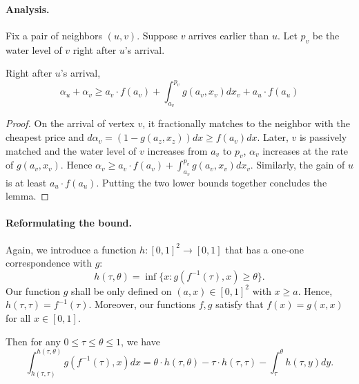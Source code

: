 \paragraph{Analysis.} Fix a pair of neighbors $(u,v)$. Suppose $v$ arrives earlier than $u$. Let $p_v$ be the water level of $v$ right after $u$'s arrival. 
\begin{lemma}
\label{lem:gain_general_arrival}
Right after $u$'s arrival,
\[
\alpha_u + \alpha_v \ge a_v \cdot f(a_v) + \int_{a_v}^{p_v} g(a_v, x_v) dx_v + a_u \cdot f(a_u)
\]	
\end{lemma}
\begin{proof}
	On the arrival of vertex $v$, it fractionally matches to the neighbor with the cheapest price and $d\alpha_v = (1-g(a_z,x_z)) dx \ge f(a_v) dx$. Later, $v$ is passively matched and the water level of $v$ increases from $a_v$ to $p_v$, $\alpha_v$ increases at the rate of $g(a_v, x_v)$. Hence $\alpha_v \ge a_v \cdot f(a_v) + \int_{a_v}^{p_v} g(a_v,x_v)dx_v$.
	Similarly, the gain of $u$ is at least $a_u \cdot f(a_u)$. Putting the two lower bounds together concludes the lemma.
\end{proof}

\paragraph{Reformulating the bound.} Again, we introduce a function $h: [0,1]^2 \to [0,1]$ that has a one-one correspondence with $g$:
\[
h(\tau,\theta) = \inf \{x: g(f^{-1}(\tau), x) \ge \theta\}. 
\]
Our function $g$ shall be only defined on $(a, x) \in [0,1]^2$ with $x \ge a$. Hence, $h(\tau,\tau)=f^{-1}(\tau)$. Moreover, our functions $f,g$ satisfy that $f(x) = g(x,x)$ for all $x \in [0,1]$.

Then for any $0 \le \tau \le \theta \le 1$, we have
\[
\int_{h(\tau,\tau)}^{h(\tau,\theta)} g(f^{-1}(\tau),x) dx = \theta \cdot h(\tau, \theta) - \tau \cdot h(\tau, \tau) - \int_{\tau}^{\theta} h(\tau, y) dy.
\]

